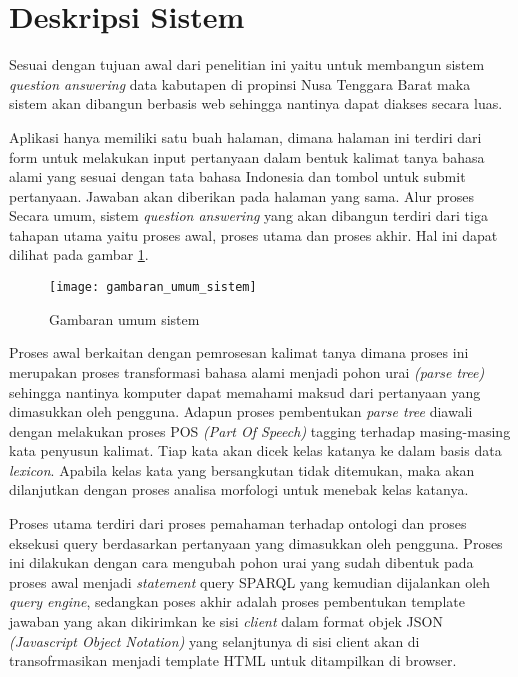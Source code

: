\section{Deskripsi Sistem}
Sesuai dengan tujuan awal dari penelitian ini yaitu untuk membangun sistem \emph{question answering} data kabutapen di propinsi Nusa Tenggara Barat maka sistem akan dibangun berbasis web sehingga nantinya dapat diakses secara luas.

Aplikasi hanya memiliki satu buah halaman, dimana halaman ini terdiri dari form untuk melakukan input pertanyaan dalam bentuk kalimat tanya bahasa alami yang sesuai dengan tata bahasa Indonesia dan tombol untuk submit pertanyaan. Jawaban akan diberikan pada halaman yang sama. Alur proses Secara umum, sistem \emph{question answering} yang akan dibangun terdiri dari tiga tahapan utama yaitu proses awal, proses utama dan proses akhir. Hal ini dapat dilihat pada gambar \ref{fig:gambaran_umum_sistem}.

\begin{figure}[th]
	\centering
	\texttt{[image: gambaran\_umum\_sistem]}
	\caption{Gambaran umum sistem}
	\label{fig:gambaran_umum_sistem}
\end{figure}

Proses awal berkaitan dengan pemrosesan kalimat tanya dimana proses ini merupakan proses transformasi bahasa alami menjadi pohon urai \emph{(parse tree)} sehingga nantinya komputer dapat memahami maksud dari pertanyaan yang dimasukkan oleh pengguna. Adapun proses pembentukan \emph{parse tree} diawali dengan melakukan proses POS \emph{(Part Of Speech)} tagging terhadap masing-masing kata penyusun kalimat. Tiap kata akan dicek kelas katanya ke dalam basis data \emph{lexicon}. Apabila kelas kata yang bersangkutan tidak ditemukan, maka akan dilanjutkan dengan proses analisa morfologi untuk menebak kelas katanya.

Proses utama terdiri dari proses pemahaman terhadap ontologi dan proses eksekusi query berdasarkan pertanyaan yang dimasukkan oleh pengguna. Proses ini dilakukan dengan cara mengubah pohon urai yang sudah dibentuk pada proses awal menjadi \emph{statement} query SPARQL yang kemudian dijalankan oleh \emph{query engine}, sedangkan poses akhir adalah proses pembentukan template jawaban yang akan dikirimkan ke sisi \emph{client} dalam format objek JSON \emph{(Javascript Object Notation)} yang selanjtunya di sisi client akan di transofrmasikan menjadi template HTML untuk ditampilkan di browser.